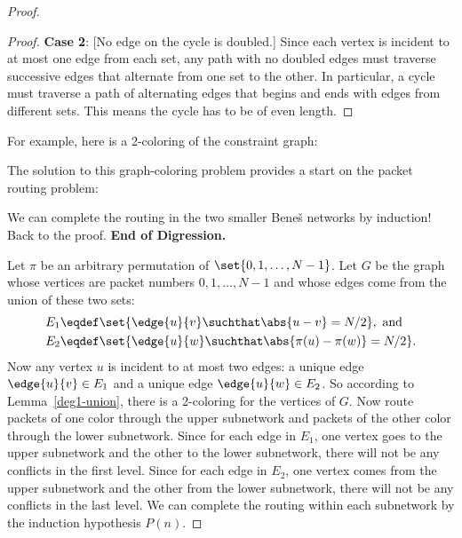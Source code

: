 \begin{proof}
\begin{proof}
  \textbf{Case 2}: [No edge on the cycle is doubled.]  Since each vertex
  is incident to at most one edge from each set, any path with no doubled
  edges must traverse successive edges that alternate from one set to the
  other.  In particular, a cycle must traverse a path of alternating edges
  that begins and ends with edges from different sets.  This means the
  cycle has to be of even length.
\end{proof}

For example, here is a 2-coloring of the constraint graph:

\begin{center}
\end{center}

The solution to this graph-coloring problem provides a start
on the packet routing problem:

We can complete the routing in the two smaller Bene\v{s} networks by
induction!  Back to the proof.  \textbf{End of Digression.}

Let $\pi$ be an arbitrary permutation of $\set{0, 1, \dots, N-1}$.  Let $G$
be the graph whose vertices are packet numbers $0, 1, \dots, N-1$ and whose edges
come from the union of these two sets:
\begin{align*}
E_1 \eqdef &  \set{\edge{u}{v} \suchthat \abs{u - v} = N/2},\ \text{and} \\
E_2 \eqdef &  \set{\edge{u}{w} \suchthat \abs{\pi(u) - \pi(w)} = N/2}.
\end{align*}
Now any vertex $u$ is incident to at most two edges: a unique edge
$\edge{u}{v} \in E_1$ and a unique edge $\edge{u}{w} \in E_2$.  So
according to Lemma~\ref{deg1-union}, there is a 2-coloring for the
vertices of $G$.  Now route packets of one color through the upper
subnetwork and packets of the other color through the lower subnetwork.
Since for each edge in $E_1$, one vertex goes to the upper subnetwork and
the other to the lower subnetwork, there will not be any conflicts in the
first level.  Since for each edge in $E_2$, one vertex comes from the
upper subnetwork and the other from the lower subnetwork, there will not
be any conflicts in the last level.  We can complete the routing within
each subnetwork by the induction hypothesis $P(n)$.
\end{proof}

\begin{problems}
\classproblems
{}

\homeworkproblems
{}
\end{problems}

\iffalse
In class, you will work through an example in which you route packets
using this recursive idea!
\fi

\endinput

